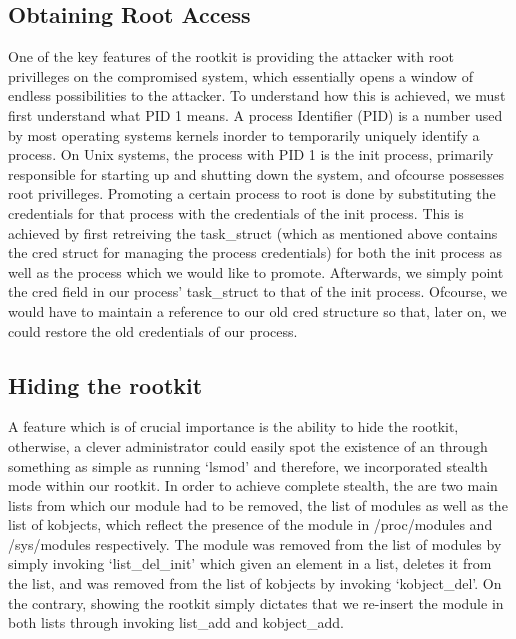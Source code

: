 \documentclass{article}
\begin{document}
\subsection{Obtaining Root Access}
    
    One of the key features of the rootkit is providing the attacker with root privilleges on the compromised system, which essentially opens a window of endless possibilities to the attacker. To understand how this is achieved, we must first understand what PID 1 means. A process Identifier (PID) is a number used by most operating systems kernels inorder to temporarily uniquely identify a process. On Unix systems, the process with PID 1 is the init process, primarily responsible for starting up and shutting down the system, and ofcourse possesses root privilleges. Promoting a certain process to root is done by substituting the credentials for that process with the credentials of the init process. This is achieved by first retreiving the task\_struct (which as mentioned above contains the cred struct for managing the process credentials) for both the init process as well as the process which we would like to promote. Afterwards, we simply point the cred field in our process' task\_struct to that of the init process. Ofcourse, we would have to maintain a reference to our old cred structure so that, later on, we could restore the old credentials of our process.
    
\subsection{Hiding the rootkit}

    A feature which is of crucial importance is the ability to hide the rootkit, otherwise, a clever administrator could easily spot the existence of an through something as simple as running `lsmod' and therefore, we incorporated stealth mode within our rootkit. In order to achieve complete stealth, the are two main lists from which our module had to be removed, the list of modules as well as the list of kobjects, which reflect the presence of the module in /proc/modules and /sys/modules respectively. The module was removed from the list of modules by simply invoking `list\_del\_init' which given an element in a list, deletes it from the list, and was removed from the list of kobjects by invoking `kobject\_del'. On the contrary, showing the rootkit simply dictates that we re-insert the module in both lists through invoking list\_add and kobject\_add.
    
\end{document}
